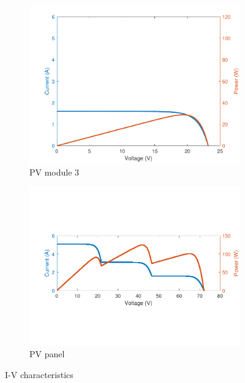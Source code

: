 \documentclass[conference]{IEEEtran}
\begin{document}
\begin{figure}[t]
\begin{subfigure}[b]{0.3\linewidth}
        \includegraphics[width=\linewidth]{PVSC-46/fig/m_3.pdf}
        \caption{PV module 3}
     \end{subfigure}
    \hfill
    \begin{subfigure}[b]{0.5\linewidth}
        \centering
        \vspace{3mm}
        \includegraphics[width=\linewidth]{PVSC-46/fig/one_panel.pdf}
        \caption{PV panel}
    \end{subfigure}
    \caption{I-V characteristics}
    \label{fig:IV}
\end{figure}
\end{document}
